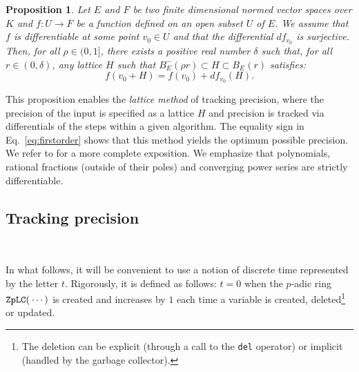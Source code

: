 \documentclass[sigconf]{acmart}
\newcommand{\OK}{\mathcal{O}_K}
\newcommand{\ZpLC}{\text{\rm \tt ZpLC}\xspace}
\def\todo#1{\ \!\!{\color{red} #1}}
\newtheorem{prop}[theo]{Proposition}
\theoremstyle{definition}
\begin{document}
\begin{prop}
\label{prop:precision}
Let $E$ and $F$ be two finite dimensional normed vector spaces over $K$ 
and $f : U \rightarrow F$ be a function defined on an open subset $U$ of 
$E$. We assume that $f$ is differentiable at some point $v_0 \in U$ and 
that the differential $df_{v_0}$ is surjective.
Then, for all $\rho \in (0, 1]$, there exists a positive real
number $\delta$ such that, for all $r \in (0, \delta)$, any lattice
$H$ such that $B^-_E(\rho r) \subset H \subset B^{\phantom -}_E(r)$ 
satisfies:
\begin{equation}
\label{eq:firstorder}
f(v_0 + H) = f(v_0) + df_{v_0} (H).
\end{equation}
\end{prop}

This proposition enables the \emph{lattice method} of tracking precision,
where the precision of the input is specified as a lattice $H$ and precision
is tracked via differentials of the steps within a given algorithm.
The equality sign in Eq.~\eqref{eq:firstorder} shows that this method
yields the optimum possible precision. 
We refer to \cite[\S 4.1]{caruso-roe-vaccon:14a} for a more complete 
exposition.
We emphasize that polynomials, rational fractions (outside of their poles)
and converging power series are strictly differentiable.

%

\subsection{Tracking precision}

\todo{Maybe, add a short intro.}

In what follows, it will be convenient to use a notion of discrete time 
represented by the letter $t$. Rigorously, it is defined as follows: 
$t=0$ when the $p$-adic ring $\ZpLC(\:\cdots)$ is created and increases by 
$1$ each time a variable is created, deleted\footnote{The deletion can
be explicit (through a call to the \texttt{del} operator) or implicit
(handled by the garbage collector).} or updated.
\end{document}
